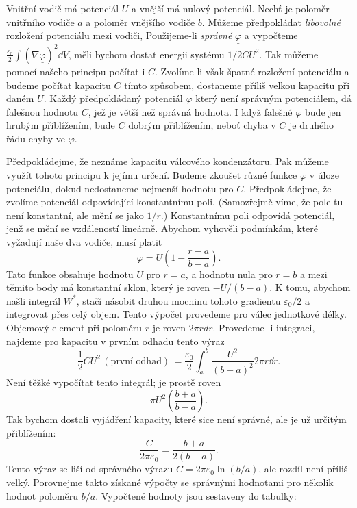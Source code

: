     Vnitřní vodič má potenciál \(U\) a vnější má nulový potenciál. Nechť je poloměr vnitřního vodiče
    \(a\) a poloměr vnějšího vodiče \(b\). Můžeme předpokládat \emph{libovolné} rozložení potenciálu
    mezi vodiči, Použijeme-li \emph{správné} \(\underline{\varphi}\) a vypočteme
    \(\frac{\varepsilon_0}{2}\int(\nabla\underline{\varphi})^2\dd{V}\), měli bychom dostat energii
    systému \(1/2 CU^2\). Tak můžeme pomocí našeho principu počítat i \(C\). Zvolíme-li však špatné
    rozložení potenciálu a budeme počítat kapacitu \(C\) tímto způsobem, dostaneme příliš velkou
    kapacitu při daném \(U\). Každý předpokládaný potenciál \(\varphi\) který není správným
    potenciálem, dá falešnou hodnotu \(C\), jež je větší než správná hodnota. I když falešné
    \(\varphi\) bude jen hrubým přiblížením, bude \(C\) dobrým přiblížením, neboť chyba v \(C\) je
    druhého řádu chyby ve \(\varphi\). 
    
    Předpokládejme, že neznáme kapacitu válcového kondenzátoru. Pak můžeme využít tohoto principu k
    jejímu určení. Budeme zkoušet různé funkce \(\varphi\) v úloze potenciálu, dokud nedostaneme
    nejmenší hodnotu pro \(C\). Předpokládejme, že zvolíme potenciál odpovídající konstantnímu poli.
    (Samozřejmě víme, že pole tu není konstantní, ale mění se jako \(1/r\).) Konstantnímu poli
    odpovídá potenciál, jenž se mění se vzdáleností lineárně. Abychom vyhověli podmínkám, které
    vyžadují naše dva vodiče, musí platit
    \begin{equation*}
      \varphi = U\left(1 - \dfrac{r-a}{b-a}\right).
    \end{equation*}
    Tato funkce obsahuje hodnotu \(U\) pro \(r=a\), a hodnotu nula pro \(r=b\) a mezi těmito body má
    konstantní sklon, který je roven \(-U/(b- a)\). K tomu, abychom našli integrál \(W^*\), stačí
    násobit druhou mocninu tohoto gradientu \(\varepsilon_0/2\) a integrovat přes celý objem. Tento
    výpočet provedeme pro válec jednotkové délky. Objemový element při poloměru \(r\) je roven
    \(2\pi rdr\). Provedeme-li integraci, najdeme pro kapacitu v prvním odhadu tento výraz
    \begin{equation*}
      \dfrac{1}{2}CU^2\,(\text{první odhad})\, 
        = \dfrac{\varepsilon_0}{2}\int_a^b\dfrac{U^2}{(b-a)^2}2\pi r\dd{r}.
    \end{equation*}
    Není těžké vypočítat tento integrál; je prostě roven
    \begin{equation*}
      \pi U^2\left(\dfrac{b+a}{b-a}\right).
    \end{equation*}
    Tak bychom dostali vyjádření kapacity, které sice není správné, ale je už určitým přiblížením:
    \begin{equation*}
      \dfrac{C}{2\pi\varepsilon_0}  = \dfrac{b+a}{2(b-a)}.
    \end{equation*}
    Tento výraz se liší od správného výrazu \(C=2\pi\varepsilon_0\ln(b/a)\), ale rozdíl není příliš
    velký. Porovnejme takto získané výpočty se správnými hodnotami pro několik hodnot poloměru
    \(b/a\). Vypočtené hodnoty jsou sestaveny do tabulky:


